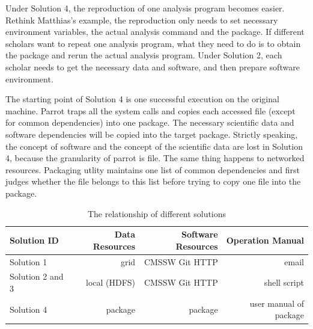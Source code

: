 \documentclass{acm_proc_article-sp}
\begin{document}
Under Solution 4, the reproduction of one analysis program becomes easier.
Rethink Matthias's example, the reproduction only needs
to set necessary environment variables, the actual analysis command
and the package. If different scholars want to repeat one analysis program,
what they need to do is to obtain the package and rerun the actual analysis
program. Under Solution 2, each scholar needs to get the necessary data and
software, and then prepare software environment. 

The starting point of Solution 4 is one successful execution on the original machine. 
Parrot traps all the system calls and copies each accessed file (except for common dependencies) into one package.
The necessary scientific data and software dependencies will be copied into the target package.
Strictly speaking, the concept of software and the concept of the scientific data are lost in Solution 4, because
the granularity of parrot is file.
The same thing happens to networked resources.
Packaging utlity maintains one list of common dependencies and first judges whether the file belongs to this list before trying to copy one file into the package.

\begin{table}
    \centering
    \begin{tabular}{|l|r|r|r|}
        \hline
        Solution ID & Data Resources & Software Resources & Operation Manual \\ \hline
        Solution 1& grid & CMSSW Git HTTP & email \\ \hline
        Solution 2 and 3& local (HDFS) & CMSSW Git HTTP & shell script \\ \hline
        Solution 4& package & package & user manual of package \\ \hline
    \end{tabular}
    \caption{The relationship of different solutions}
    \label{table:relationship}
\end{table}

\end{document}
